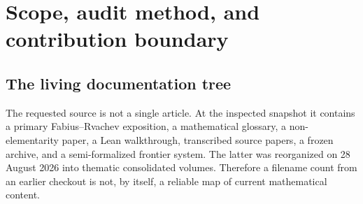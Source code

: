 \documentclass[11pt]{article}
\numberwithin{equation}{section}
\theoremstyle{definition}
\theoremstyle{remark}
\begin{document}
\begin{abstract}
The existing Pascal--Rvachev hierarchy receives a new geometric
factorization: its rank-$r$ law is an explicit infinite Radon projection of
classical rank-one Rvachev variables, with scale multiplicities
$\binom{h-1}{r-2}$.  The report also derives exact positive dyadic-comb
cubature for every profile, an inverse-Fabius coordinate representation of the
whole projection cone, and a detailed conjectural Lambert--$W$ endpoint
program.  Fully commented Python code, exact CSV tables, vector and raster
figures, the source-audit record, and build instructions accompany the
manuscript.  Package-wide checksum ledgers are retired; their historical
provenance remains recoverable from Git history.  The word ``new'' throughout
means apparently new relative to
the audited repository corpus, not a claim of worldwide historical priority.
\end{abstract}

\tableofcontents
\clearpage
{}

\section{Scope, audit method, and contribution boundary}
\label{sec:audit}

\subsection{The living documentation tree}

The requested source is not a single article.  At the inspected snapshot it
contains a primary Fabius--Rvachev exposition, a mathematical glossary, a
non-elementarity paper, a Lean walkthrough, transcribed source papers, a
frozen archive, and a semi-formalized frontier system.  The latter was
reorganized on 28 August 2026 into thematic consolidated volumes.  Therefore
a filename count from an earlier checkout is not, by itself, a reliable map of
current mathematical content.
\end{document}
